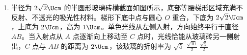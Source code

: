 \documentclass[\gkver]{gaokaozhenti}
\begin{document}
\begin{enumerate}
{海卫二绕海王星公转：设海卫二公转周期为 $T_{\text{卫}}$，轨道半长轴为 $r_{\text{卫}}$，海王星质量为 $M_{\text{海}}$，则

\[ \frac{GM_{\text{海}}m_{\text{卫}}}{r_{\text{卫}}^{2}} = m_{\text{卫}}\left(\frac{2\pi}{T_{\text{卫}}}\right)^{2}r_{\text{卫}} \]

已知 $T_{\text{卫}} \approx T_{\text{地}}$，且 $\frac{M_{\text{太}}}{M_{\text{海}}} = a$，则 $\frac{r_{\text{卫}}^{3}}{r_{\text{地}}^{3}} = \frac{M_{\text{海}}}{M_{\text{太}}} = \frac{1}{a}$

整理得 $r_{\text{卫}}^{3} = \frac{1}{a} \cdot (1\UAU)^{3}$

故 $r_{\text{卫}} = \frac{1}{\sqrt[3]{a}}\UAU$

故选 A。
}

\item
半径为 $2\sqrt{2}\Ucm$ 的半圆形玻璃砖横截面如图所示，底部等腰梯形区域充满不反射、不透光的吸光性材料。梯形下底中点与圆心 $O$ 重合，下底为 $2\sqrt{2}\Ucm$，上底为 $2\Ucm$，高为 $1\Ucm$。单色光线从左侧入射，方向始终平行于直径 $AB$。当入射点从 $A$ 点逐渐向上移动至 $C$ 点时，光线恰能从玻璃砖另一侧射出，$C$ 点与 $AB$ 的距离为 $2\Ucm$，该玻璃的折射率为 
\onepicture[w=3.85cm]{}
{$\sqrt{5}$}
{$\frac{\sqrt{10}}{2}$}
{$\frac{\sqrt{5}}{2}$}


\end{enumerate}
\end{document}
